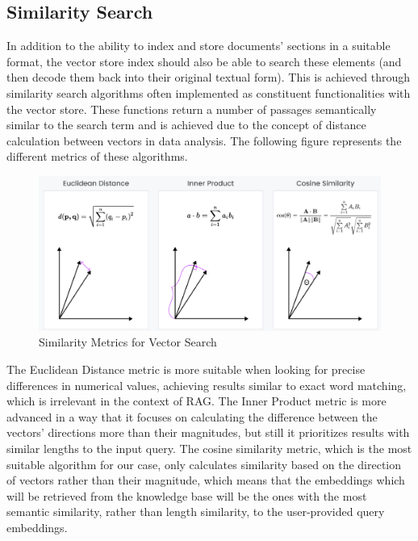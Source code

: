 \subsection{Similarity Search}
In addition to the ability to index and store documents' sections in a suitable format, the vector store index should also be able to search these elements (and then decode them back into their original textual form). This is achieved through similarity search algorithms often implemented as constituent functionalities with the vector store. These functions return a number of passages semantically similar to the search term and is achieved due to the concept of distance calculation between vectors in data analysis.\newline
The following figure represents the different metrics of these algorithms.
\begin{figure}[H]
    \centering
    \includegraphics[width=\linewidth]{./figures/vector-distance-metrics.png}
    \caption{Similarity Metrics for Vector Search \cite{zsimilaritymetrics}}
\end{figure}
The Euclidean Distance metric is more suitable when looking for precise differences in numerical values, achieving results similar to exact word matching, which is irrelevant in the context of RAG. The Inner Product metric is more advanced in a way that it focuses on calculating the difference between the vectors' directions more than their magnitudes, but still it prioritizes results with similar lengths to the input query. The cosine similarity metric, which is the most suitable algorithm for our case, only calculates similarity based on the direction of vectors rather than their magnitude, which means that the embeddings which will be retrieved from the knowledge base will be the ones with the most semantic similarity, rather than length similarity, to the user-provided query embeddings.
